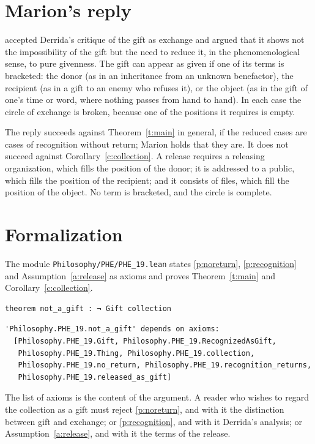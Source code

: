 \documentclass{situationist-preprint}
\begin{document}
\section{Marion's reply}

\citet{Marion1997} accepted Derrida's critique of the gift as exchange and argued that it shows not the impossibility of the gift but the need to reduce it, in the phenomenological sense, to pure givenness. The gift can appear as given if one of its terms is bracketed: the donor (as in an inheritance from an unknown benefactor), the recipient (as in a gift to an enemy who refuses it), or the object (as in the gift of one's time or word, where nothing passes from hand to hand). In each case the circle of exchange is broken, because one of the positions it requires is empty.

The reply succeeds against Theorem~\ref{t:main} in general, if the reduced cases are cases of recognition without return; Marion holds that they are. It does not succeed against Corollary~\ref{c:collection}. A release requires a releasing organization, which fills the position of the donor; it is addressed to a public, which fills the position of the recipient; and it consists of files, which fill the position of the object. No term is bracketed, and the circle is complete.

\section{Formalization}

The module \nolinkurl{Philosophy/PHE/PHE_19.lean} states \ref{p:noreturn}, \ref{p:recognition} and Assumption~\ref{a:release} as axioms and proves Theorem~\ref{t:main} and Corollary~\ref{c:collection}.

\begin{lstlisting}
theorem not_a_gift : ¬ Gift collection
\end{lstlisting}

\begin{lstlisting}
'Philosophy.PHE_19.not_a_gift' depends on axioms:
  [Philosophy.PHE_19.Gift, Philosophy.PHE_19.RecognizedAsGift,
   Philosophy.PHE_19.Thing, Philosophy.PHE_19.collection,
   Philosophy.PHE_19.no_return, Philosophy.PHE_19.recognition_returns,
   Philosophy.PHE_19.released_as_gift]
\end{lstlisting}

The list of axioms is the content of the argument. A reader who wishes to regard the collection as a gift must reject \ref{p:noreturn}, and with it the distinction between gift and exchange; or \ref{p:recognition}, and with it Derrida's analysis; or Assumption~\ref{a:release}, and with it the terms of the release.
\end{document}
